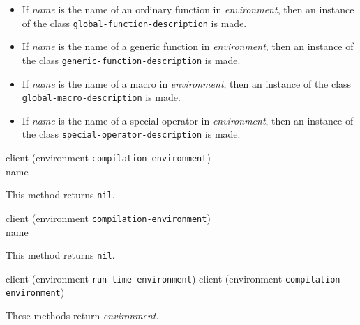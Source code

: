 \begin{itemize}
\item If \textit{name} is the name of an ordinary function in
  \textit{environment}, then an instance of the \trucler{} class
  \texttt{global-function-description} is made.
\item If \textit{name} is the name of a generic function in
  \textit{environment}, then an instance of the \trucler{} class
  \texttt{generic-function-description} is made.
\item If \textit{name} is the name of a macro in
  \textit{environment}, then an instance of the \trucler{} class
  \texttt{global-macro-description} is made.
\item If \textit{name} is the name of a special operator in
  \textit{environment}, then an instance of the \trucler{} class
  \texttt{special-operator-description} is made.
\end{itemize}

 {client (environment
  {\tt compilation-environment}) \\ name}

This method returns \texttt{nil}.

 {client (environment
  {\tt compilation-environment}) \\ name}

This method returns \texttt{nil}.

 {client (environment
  {\tt run-time-environment})}
 {client (environment
  {\tt compilation-environment})}

These methods return \textit{environment}.
